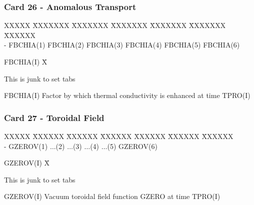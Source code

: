 \subsubsection{Card 26 - Anomalous Transport}
\begin{tabbing}
XXXXX \= XXXXXXX \= XXXXXXX \= XXXXXXX \= XXXXXXX \= XXXXXXX \=
XXXXXX       \\
\footnotesize  - \>\footnotesize FBCHIA(1)  \>\footnotesize FBCHIA(2) \>\footnotesize
FBCHIA(3) \>\footnotesize FBCHIA(4) \>\footnotesize FBCHIA(5) \>\footnotesize FBCHIA(6)
\end{tabbing}
\begin{tabbing}
FBCHIA(I) X\= \parbox[t]{\width}{This is junk to set tabs} \kill
FBCHIA(I) \>Factor by which thermal conductivity is enhanced at time TPRO(I) \\
\end{tabbing}
\newpage \subsubsection{Card 27 - Toroidal Field}
\begin{tabbing}
XXXXX \= XXXXXX \= XXXXXX \= XXXXXX \= XXXXXX \= XXXXXX \= XXXXXX       \\
\footnotesize  - \>\footnotesize GZEROV(1)  \>\footnotesize $\ldots$(2) \>\footnotesize  $\ldots$(3) \>\footnotesize $\ldots$(4) \>\footnotesize $\ldots$(5) \>\footnotesize GZEROV(6)
\end{tabbing}
\begin{tabbing}
GZEROV(I) X\= \parbox[t]{\width}{This is junk to set tabs} \kill
GZEROV(I) \> Vacuum toroidal field function GZERO at time TPRO(I) \\
\end{tabbing}

